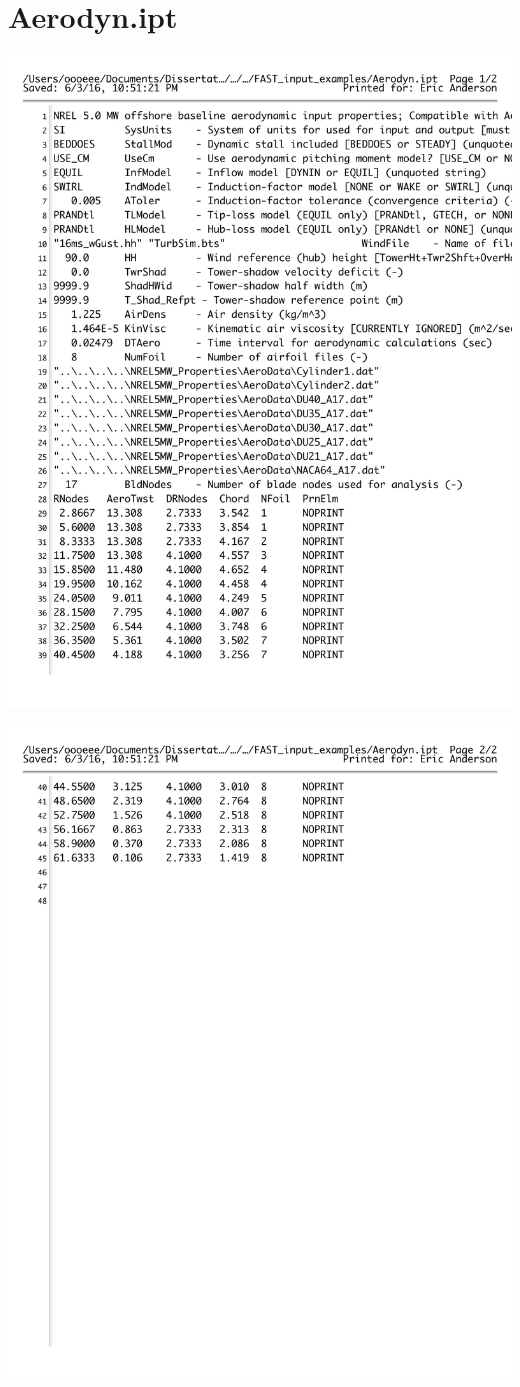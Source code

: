 \section{Aerodyn.ipt} \label{sectionA-2}

\includegraphics[width=.95\linewidth]{Figures/AppendixAFigures/AerodynP1.pdf}		

\includegraphics[width=.95\linewidth]{Figures/AppendixAFigures/AerodynP2.pdf}